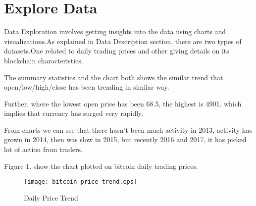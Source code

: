 \documentclass{article}
\begin{document}
\section{Explore Data}
Data Exploration involves getting insights into the data using charts and visualizations.As explained in Data Description section, there are two types of datasets.One related to daily trading prices and other giving details on its blockchain characteristics.


The summary statistics and the chart both shows the similar trend that open/low/high/close has been trending in similar way.\newline

Further, where the lowest open price has been 68.5, the highest is 4901. which implies that currency has surged very rapidly.\newline

From charts we can see that there hasn't been much activity in 2013, activity has grown in 2014, then was slow in 2015, but recently 2016 and 2017, it has picked lot of action from traders.\newline 


\justify Figure 1. show the chart plotted on bitcoin daily trading prices. \newline

\begin{figure}
    \centering
    \texttt{[image: bitcoin\_price\_trend.eps]}
    \caption{Daily Price Trend}
    \label{fig:my_label}
\end{figure}
\end{document}
